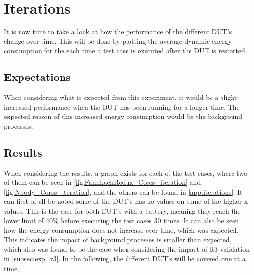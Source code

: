 \section{Iterations}

It is now time to take a look at how the performance of the different DUT's change over time. This will be done by plotting the average dynamic energy consumption for the each time a test case is executed after the DUT is restarted.

\subsection{Expectations}

When considering what is expected from this experiment, it would be a slight increased performance when the DUT has been running for a longer time. The expected reason of this increased energy consumption would be the background processes. 

\subsection{Results} 

When considering the results, a graph exists for each of the test cases, where two of them can be seen in \cref{fig:FannkuchRedux_Cores_iteration} and \cref{fig:Nbody_Cores_iteration}, and the others can be found in \cref{app:iterations}. It can first of all be noted some of the DUT's has no values on some of the higher x-values. This is the case for both DUT's with a battery, meaning they reach the lower limit of 40\% before executing the test cases 30 times. It can also be seen how the energy consumption does not increase over time, which was expected. This indicates the impact of background processes is smaller than expected, which also was found to be the case when considering the impact of R3 validation in \cref{subsec:exp_r3}. In the following, the different DUT's will be covered one at a time.

